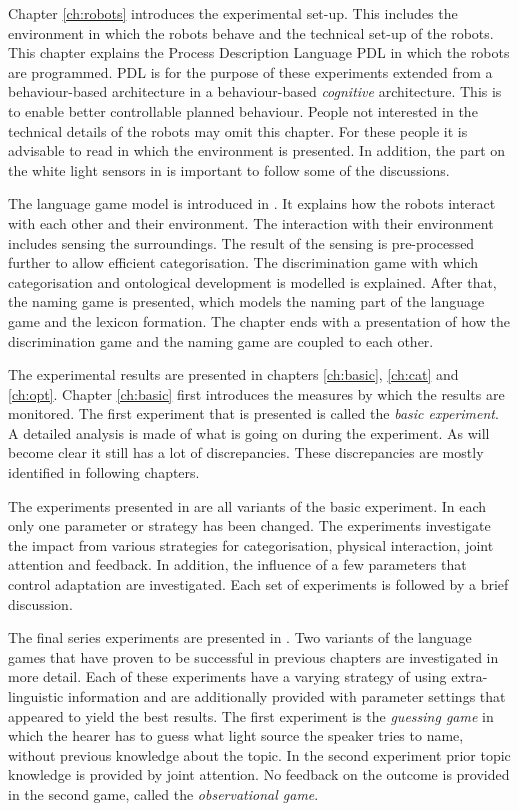 Chapter \ref{ch:robots} introduces the experimental set-up. This includes the environment in which the robots behave and the technical set-up of the robots. This chapter explains the Process Description Language PDL in which the robots are programmed. PDL is for the purpose of these experiments extended from a behaviour-based architecture in a behaviour-based {\em cognitive} architecture. This is to enable better controllable planned behaviour. People not interested in the technical details of the robots may omit this chapter. For these people it is advisable to read  in which the environment is presented. In addition, the part on the white light sensors in  is important to follow some of the discussions.

The language game model is introduced in . It explains how the robots interact with each other and their environment. The interaction with their environment includes sensing the surroundings. The result of the sensing is pre-processed further to allow efficient categorisation. The discrimination game with which categorisation and ontological development is modelled is explained. After that, the naming game is presented, which models the naming part of the language game and the lexicon formation. The chapter ends with a presentation of how the discrimination game and the naming game are coupled to each other.


The experimental results are presented in chapters \ref{ch:basic}, \ref{ch:cat} and \ref{ch:opt}. Chapter \ref{ch:basic} first introduces the measures by which the results are monitored. The first experiment that is presented is called the {\em basic experiment}. A detailed analysis is made of what is going on during the experiment. As will become clear it still has a lot of discrepancies. These discrepancies are mostly identified in following chapters. 

The experiments presented in  are all variants of the basic experiment. In each only one parameter or strategy has been changed. The experiments investigate the impact from various strategies for categorisation, physical interaction, joint attention and feedback. In addition, the influence of a few parameters that control adaptation are investigated. Each set of experiments is followed by a brief discussion.

The final series experiments are presented in . Two variants of the language games that have proven to be successful in previous chapters are investigated in more detail. Each of these experiments have a varying strategy of using extra-linguistic information and are additionally provided with parameter settings that appeared to yield the best results. The first experiment is the {\em guessing game} in which the hearer has to guess what light source the speaker tries to name, without previous knowledge about the topic. In the second experiment prior topic knowledge is provided by joint attention. No feedback on the outcome is provided in the second game, called the {\em observational game}.


